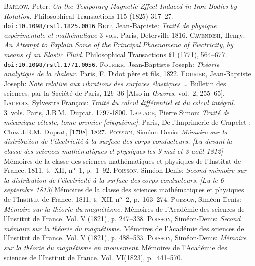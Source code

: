 \documentclass[11pt,notitlepage]{amsart}
\let\Author\textsc
\let\Title\textit
\begin{document}
\begin{thebibliography}{9}
 \Author{Barlow}, Peter: \Title{On the Temporary Magnetic Effect 
Induced in Iron Bodies by Rotation.} Philosophical Transactions 115 (1825) 317--27. \texttt{doi:10.1098/rstl.1825.0016}
 \Author{Biot}, Jean-Baptiste: \Title{Trait\'e de physique 
exp\'erimentale et math\'ematique} 3 vols. Paris, Deterville 1816.
 \Author{Cavendish}, Henry: \Title{An Attempt to Explain Some of the
Principal Phaenomena of Electricity, by means of an Elastic Fluid.}
Philosophical Transactions 61 (1771), 564--677.
\texttt{doi:10.1098/rstl.1771.0056}.
 \Author{Fourier}, Jean-Baptiste Joseph: \Title{Th\'eorie analytique
de la chaleur.} Paris, F. Didot p\`ere et fils, 1822.
 \Author{Fourier}, Jean-Baptiste Joseph: \Title{Note relative aux
vibrations des surfaces \'elastiques \ldots} Bulletin des sciences, par la
Soci\'et\'e de Paris, 129--36 [Also in \Title{\OE{}uvres}, vol.~2, 255--65].
 \Author{Lacroix}, Sylvestre Fran\c{c}ois: \Title{Trait\'e du 
calcul diff\'erentiel et du calcul int\'egral.} 3~vols. Paris, J.B.M.~Duprat.
1797-1800.
 \Author{Laplace}, Pierre Simon: \Title{Trait\'e de m\'ecanique
c\'eleste, tome premier-[cinqui\`eme].} Paris, De l'Imprimerie de Crapelet :
Chez J.B.M. Duprat, [1798]--1827.
 \Author{Poisson}, Sim\'eon-Denis: \Title{M\'emoire sur la
distribution de l'\'electricit\'e \`a la surface des corps conducteurs.
[Lu devant la classe des sciences math\'ematiques et physiques les 9 mai
et 3 ao\^ut 1812]}
M\'emoires de la classe des sciences math\'ematiques et physiques de l'Institut
de France. 1811, t.~XII, n${}^\text{o}$~1, p.~1--92.
 \Author{Poisson}, Sim\'eon-Denis: \Title{Second m\'emoire sur la 
distribution  de l'\'electricit\'e \`a la surface des corps conducteurs.
[Lu le 6 septembre 1813]}
M\'emoires de la classe des sciences math\'ematiques et physiques de l'Institut
de France. 1811, t.~XII, n${}^\text{o}$~2, p.~163--274.
 \Author{Poisson}, Sim\'eon-Denis: \Title{M\'emoire sur la th\'eorie du 
magn\'etisme.} M\'emoires de l'Acad\'emie des sciences de l'Institut de France. Vol. V (1821), p. 247--338.
 \Author{Poisson}, Sim\'eon-Denis: \Title{Second m\'emoire sur la th\'eorie du 
magn\'etisme.} M\'emoires de l'Acad\'emie des sciences de l'Institut de France. Vol. V (1821), p. 488--533.
 \Author{Poisson}, Sim\'eon-Denis: \Title{M\'emoire sur la 
th\'eorie du magn\'etisme en mouvement.} M\'emoires de l'Acad\'emie des sciences de l'Institut de France. Vol.~VI(1823), p.~441--570.
\end{thebibliography}
\end{document}
